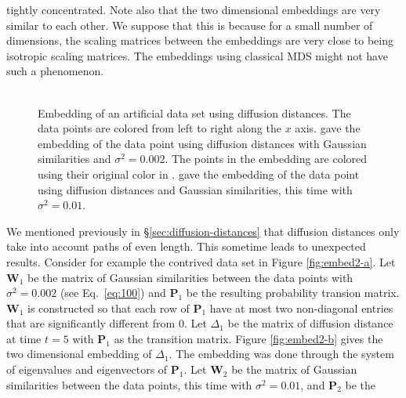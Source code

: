 tightly concentrated. Note also that the two dimensional embeddings
are very similar to each other. We suppose that this is because for a
small number of dimensions, the scaling matrices between the
embeddings are very close to being isotropic scaling matrices. The
embeddings using classical MDS might not have such a
phenomenon. \\ \\
%
%
\begin{figure}[htbp]
  \centering
    \hspace{8pt}
        \caption{Embedding of an artificial data set
           using diffusion distances. The data
          points are colored from left to right along the $x$
          axis.  gave the embedding of the data
          point using diffusion distances with Gaussian similarities
          and $\sigma^{2} = 0.002$. The points in the embedding are
          colored using their original color in
          .  gave the
          embedding of the data point using diffusion distances and
          Gaussian similarities, this time with $\sigma^{2} = 0.01$. }
  \label{fig:embed2}
\end{figure}
We mentioned previously in \S \ref{sec:diffusion-distances} that
diffusion distances only take into account paths of even length. This
sometime leads to unexpected results. Consider for example the
contrived data set in Figure \ref{fig:embed2-a}. Let $\mathbf{W}_1$ be
the matrix of Gaussian similarities between the data points with
$\sigma^{2} = 0.002$ (see Eq.~\eqref{eq:100}) and $\mathbf{P}_1$ be the
resulting probability transion matrix. $\mathbf{W}_1$ is constructed
so that each row of $\mathbf{P}_1$ have at most two non-diagonal
entries that are significantly different from $0$. Let $\Delta_{1}$ be
the matrix of diffusion distance at time $t = 5$ with $\mathbf{P}_1$
as the transition matrix. Figure \ref{fig:embed2-b} gives the two
dimensional embedding of $\Delta_{1}$. The embedding was done through
the system of eigenvalues and eigenvectors of $\mathbf{P}_1$. Let
$\mathbf{W}_2$ be the matrix of Gaussian similarities between the data
points, this time with $\sigma^{2} = 0.01$, and $\mathbf{P}_2$ be the
